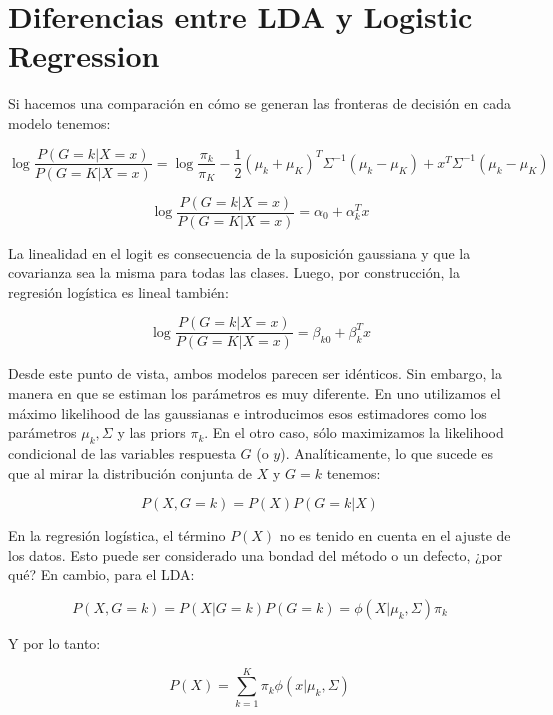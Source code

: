\documentclass[aps,onecolumn,12pt,notitlepage]{revtex4-1}
\begin{document}
\section*{Diferencias entre LDA y Logistic Regression}

Si hacemos una comparación en cómo se generan las fronteras de decisión en cada modelo tenemos:

\begin{equation}
\log \frac{P(G=k|X=x)}{P(G=K|X=x)} = \log \frac{\pi_{k}}{\pi_{K}} - \frac{1}{2}(\mu_{k}+\mu_{K})^{T}\Sigma^{-1}(\mu_{k}- \mu_{K}) + x^{T}\Sigma^{-1}(\mu_{k}-\mu_{K})
\end{equation}

\begin{equation}
\log \frac{P(G=k|X=x)}{P(G=K|X=x)} = \alpha_{0} + \alpha_{k}^{T}x
\end{equation}

La linealidad en el logit es consecuencia de la suposición gaussiana y que la covarianza sea la misma para todas las clases. Luego, por construcción, la regresión logística es lineal también:

\begin{equation}
\log \frac{P(G=k|X=x)}{P(G=K|X=x)}  = \beta_{k0} + \beta_{k}^{T}x
\end{equation}

Desde este punto de vista, ambos modelos parecen ser idénticos. Sin embargo, la manera en que se estiman los parámetros es muy diferente. En uno utilizamos el máximo likelihood de las gaussianas e introducimos esos estimadores como los parámetros $\mu_{k},\Sigma$ y las priors $\pi_{k}$. En el otro caso, sólo maximizamos la likelihood condicional de las variables respuesta $G$ (o $y$). Analíticamente, lo que sucede es que al mirar la distribución conjunta de $X$ y $G=k$ tenemos:

\begin{equation}
P(X,G=k) = P(X)P(G=k|X)
\end{equation}

En la regresión logística, el término $P(X)$ no es tenido en cuenta en el ajuste de los datos. Esto puede ser considerado una bondad del método o un defecto, ¿por qué? En cambio, para el LDA:

\begin{equation}
P(X,G=k) = P(X|G = k)P(G=k) = \phi(X|\mu_{k},\Sigma) \pi_{k}
\end{equation}

Y por lo tanto:

\begin{equation}
P(X) = \sum_{k=1}^{K} \pi_{k} \phi(x|\mu_{k},\Sigma)
\end{equation}
\end{document}
